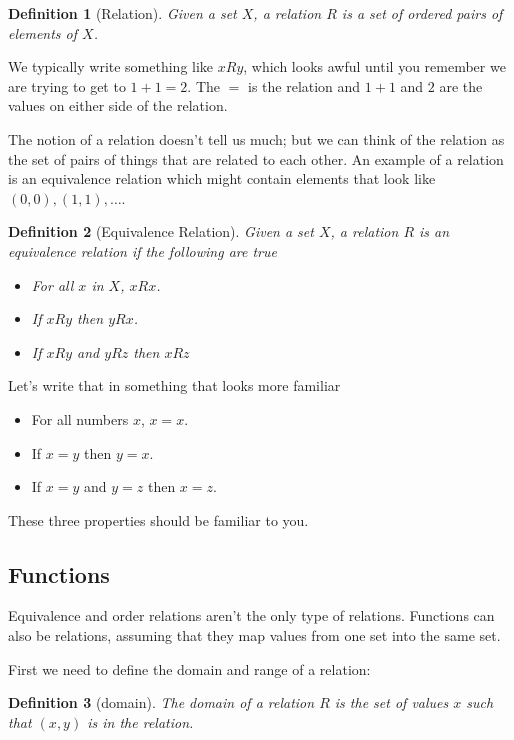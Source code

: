 \documentclass[oneside]{book}
\newtheorem{definition}{Definition}
\begin{document}
\begin{spacing}{1.618}
\begin{definition}[Relation]
Given a set $X$, a relation $R$ is a set of ordered pairs of elements of $X$. 
\end{definition}

We typically write something like $xRy$, which looks awful until you remember we are trying to get to $1+1=2$. The $=$ is the relation and $1+1$ and $2$ are the values on either side of the relation. 

The notion of a relation doesn't tell us much; but we can think of the relation as the set of pairs of things that are related to each other. An example of a relation is an equivalence relation which might contain elements that look like $(0, 0), (1, 1), \dots$. 

\begin{definition}[Equivalence Relation]
Given a set $X$, a relation $R$ is an equivalence relation if the following are true
\begin{itemize}
	\item For all $x$ in $X$, $xRx$.
	\item If $xRy$ then $yRx$.
	\item If $xRy$ and $yRz$ then $xRz$
\end{itemize}
\end{definition}

Let's write that in something that looks more familiar
\begin{itemize}
	\item For all numbers $x$, $x=x$. 
	\item If $x=y$ then $y=x$.
	\item If $x=y$ and $y=z$ then $x=z$. 
\end{itemize}

These three properties should be familiar to you. 

\subsection{Functions}

Equivalence and order relations aren't the only type of relations. Functions can also be relations, assuming that they map values from one set into the same set. 

First we need to define the domain and range of a relation: 

\begin{definition}[domain]
	The domain of a relation $R$ is the set of values $x$ such that $(x, y)$ is in the relation. 
\end{definition}


\end{spacing}
\end{document}
